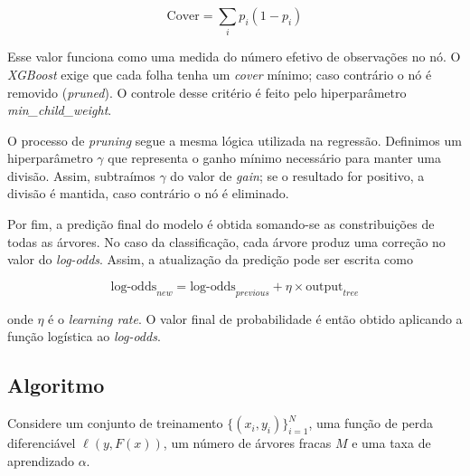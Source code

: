 \documentclass{article}
\begin{document}
\begin{equation}
\text{Cover} = \sum_i p_i (1 - p_i)
\end{equation}

Esse valor funciona como uma medida do número efetivo de observações no nó.
O \textit{XGBoost} exige que cada folha tenha um \textit{cover} mínimo; caso
contrário o nó é removido (\textit{pruned}). O controle desse critério é 
feito pelo hiperparâmetro \textit{min\_child\_weight}.

O processo de \textit{pruning} segue a mesma lógica utilizada na regressão.
Definimos um hiperparâmetro $\gamma$ que representa o ganho mínimo necessário 
para manter uma divisão. Assim, subtraímos $\gamma$ do valor de \textit{gain};
se o resultado for positivo, a divisão é mantida, caso contrário o nó é 
eliminado.

Por fim, a predição final do modelo é obtida somando-se as constribuições de 
todas as árvores. No caso da classificação, cada árvore produz uma correção 
no valor do \textit{log-odds}. Assim, a atualização da predição pode ser escrita
como

\begin{equation}
\text{log-odds}_{new} =
\text{log-odds}_{previous} +
\eta \times \text{output}_{tree}
\end{equation}

onde $\eta$ é o \textit{learning rate}. O valor final de probabilidade é então 
obtido aplicando a função logística ao \textit{log-odds}.

\subsection{Algoritmo}

Considere um conjunto de treinamento $\{(x_i, y_i)\}_{i=1}^{N}$, uma função de perda
diferenciável $\ell(y, F(x))$, um número de árvores fracas $M$ e uma taxa de
aprendizado $\alpha$.
\end{document}
